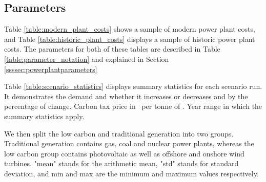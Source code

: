 

\subsection{Parameters}

Table \ref{table:modern_plant_costs} shows a sample of modern power plant costs, and Table \ref{table:historic_plant_costs} displays a sample of historic power plant costs. The parameters for both of these tables are described in Table \ref{table:parameter_notation} and explained in Section \ref{ssssec:powerplantparameters}

Table \ref{table:scenario_statistics} displays summary statistics for each scenario run. It demonstrates the demand and whether it increases or decreases and by the percentage of change. Carbon tax price in \textsterling\ per tonne of . Year range in which the summary statistics apply. 

We then split the low carbon and traditional generation into two groups. Traditional generation contains gas, coal and nuclear power plants, whereas the low carbon group contains photovoltaic as well as offshore and onshore wind turbines. "mean" stands for the arithmetic mean, "std" stands for standard deviation, and min and max are the minimum and maximum values respectively.

